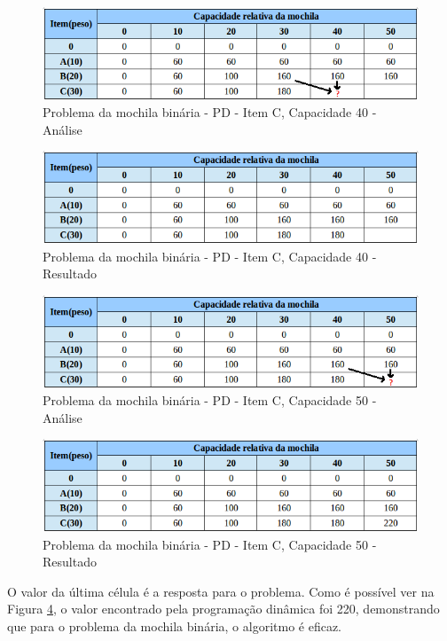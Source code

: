 \begin{itemize}
\FloatBarrier
\begin{figure}[!h]
\centering
\includegraphics[keepaspectratio=true,scale=0.6]{figuras/mochila30_40.png}
\caption{Problema da mochila binária - PD - Item C, Capacidade 40 - Análise}
\label{mochila30_40}
\end{figure}

\FloatBarrier
\begin{figure}[!h]
\centering
\includegraphics[keepaspectratio=true,scale=0.6]{figuras/mochila30_40_resp.png}
\caption{Problema da mochila binária - PD - Item C, Capacidade 40 - Resultado}
\label{mochila30_40_resp}
\end{figure}

\FloatBarrier
\begin{figure}[!h]
\centering
\includegraphics[keepaspectratio=true,scale=0.6]{figuras/mochila30_50.png}
\caption{Problema da mochila binária - PD - Item C, Capacidade 50 - Análise}
\label{mochila30_50}
\end{figure}

\FloatBarrier
\begin{figure}[!h]
\centering
\includegraphics[keepaspectratio=true,scale=0.5]{figuras/mochilaResultado.png}
\caption{Problema da mochila binária - PD - Item C, Capacidade 50 - Resultado}
\label{mochila30_50_resp}
\end{figure}

O valor da última célula é a resposta para o problema. Como é possível ver na Figura \ref{mochila30_50_resp}, o valor encontrado pela programação dinâmica foi 220, demonstrando que para o problema da mochila binária, o algoritmo é eficaz.
\end{itemize}
 
